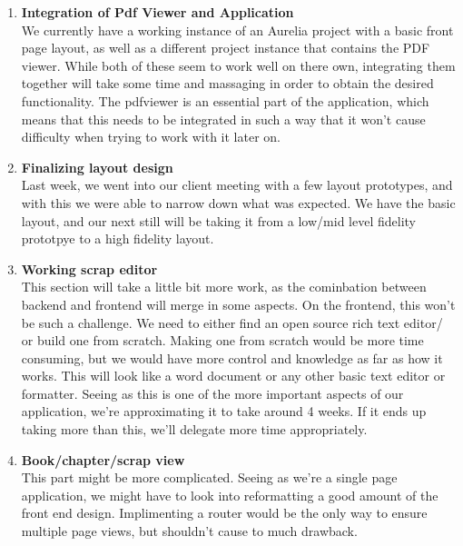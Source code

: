 \documentclass[onecolumn, draftclsnofoot,10pt, compsoc]{IEEEtran}
\begin{document}
\begin{enumerate}
    \item
    \textbf{Integration of Pdf Viewer and Application} \\
	We currently have a working instance of an Aurelia project with a basic front page layout, 
	as well as a different project instance that contains the PDF viewer. While both of these
	seem to work well on there own, integrating them together will take some time and massaging 
	in order to obtain the desired functionality. The pdfviewer is an essential part of the 
	application, which means that this needs to be integrated in such a way that it won't cause
	difficulty when trying to work with it later on. \\

    \item
    \textbf{Finalizing layout design} \\

	Last week, we went into our client meeting with a few layout prototypes, and with this we 
	were able to narrow down what was expected. We have the basic layout, and our next still 
	will be taking it from a low/mid level fidelity prototpye to a high fidelity layout. \\

	\item
	\textbf{Working scrap editor} \\

	This section will take a little bit more work, as the cominbation between backend and 
	frontend will merge in some aspects. On the frontend, this won't be such a challenge. 
	We need to either find an open source rich text editor/ or build one from scratch. 
	Making one from scratch would be more time consuming, but we would have more control
	and knowledge as far as how it works. This will look like a word document or any other 
	basic text editor or formatter. Seeing as this is one of the more important aspects of 
	our application, we’re approximating it to take around 4 weeks. If it ends up taking more 
	than this, we’ll delegate more time appropriately. \\

	\item
	\textbf{Book/chapter/scrap view} \\

	This part might be more complicated. Seeing as we're a single page application, we might 
	have to look into reformatting a good amount of the front end design. Implimenting a router 
	would be the only way to ensure multiple page views, but shouldn't cause to much drawback. \\


\end{enumerate}
\end{document}
